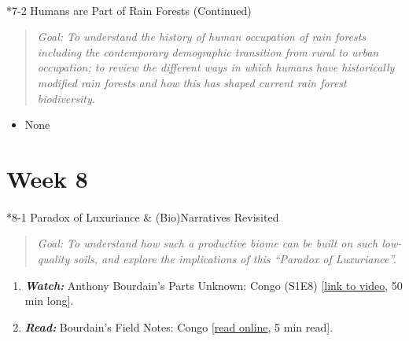 \documentclass[
  10pt,
  letterpaper,
  oneside,
  open=any]{scrbook}
\makeatletter
\let\oldparagraph\paragraph
\renewcommand{\paragraph}{
    \@ifstar
      \xxxParagraphStar
      \xxxParagraphNoStar
  }
\newcommand{\xxxParagraphStar}[1]{\oldparagraph*{#1}\mbox{}}
\newcommand{\xxxParagraphNoStar}[1]{\oldparagraph{#1}\mbox{}}
\providecommand{\tightlist}{%
  \setlength{\itemsep}{0pt}\setlength{\parskip}{0pt}}
\makeatother
\begin{document}
\paragraph*{7-2 Humans are Part of Rain Forests
(Continued)}\label{humans-are-part-of-rain-forests-continued}

\begin{quote}
\emph{Goal: To understand the history of human occupation of rain
forests including the contemporary demographic transition from rural to
urban occupation; to review the different ways in which humans have
historically modified rain forests and how this has shaped current rain
forest biodiversity.}
\end{quote}

\begin{itemize}
\tightlist
\item
  None
\end{itemize}

\section*{Week 8}\label{week-8}


\paragraph*{8-1 Paradox of Luxuriance \& (Bio)Narratives
Revisited}\label{paradox-of-luxuriance-bionarratives-revisited}

\begin{quote}
\emph{Goal: To understand how such a productive biome can be built on
such low-quality soils, and explore the implications of this ``Paradox
of Luxuriance''.}
\end{quote}

\begin{enumerate}
\def\labelenumi{\arabic{enumi}.}
\item
  \textbf{\emph{Watch:}} Anthony Bourdain's Parts Unknown: Congo (S1E8)
  {[}\href{https://www.youtube.com/watch?v=k59ToTXOuuE}{link to video},
  50 min long{]}.
\item
  \textbf{\emph{Read:}} Bourdain's Field Notes: Congo
  {[}\href{https://explorepartsunknown.com/congo/bourdains-field-notes-congo/}{read
  online}, 5 min read{]}.
\end{enumerate}
\end{document}
